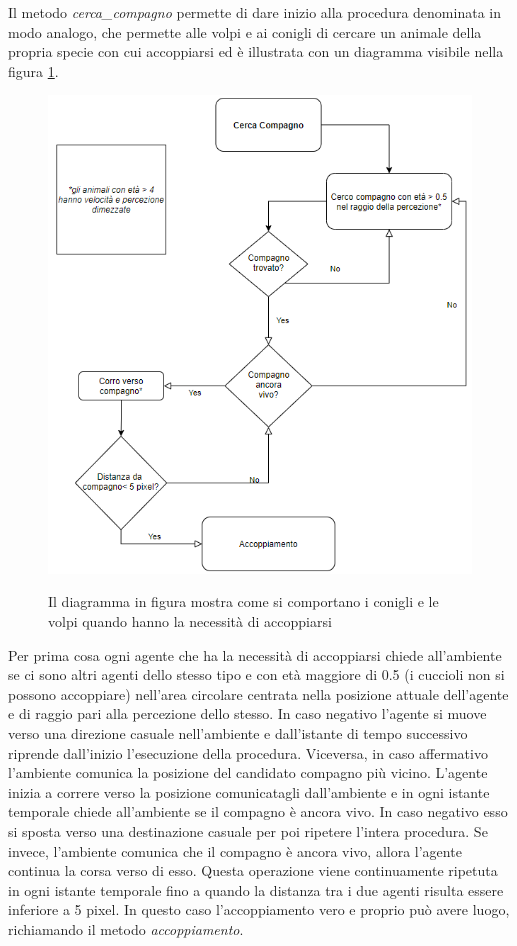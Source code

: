 \documentclass[11pt]{article}
\begin{document}
Il metodo \emph{cerca\_compagno} permette di dare inizio alla procedura denominata in modo analogo, che permette alle volpi e ai conigli di cercare un animale della propria specie con cui accoppiarsi ed è illustrata con un diagramma visibile nella figura \ref{fig:diagrammaAccoppiamento}.
\begin{figure}
     \centering
     \includegraphics[scale = 0.7]{Cerca_Compagno.PNG}
     \label{fig:diagrammaAccoppiamento}
     \caption{Il diagramma in figura mostra come si comportano i conigli e le volpi quando hanno la necessità di accoppiarsi}
\end{figure}
Per prima cosa ogni agente che ha la necessità di accoppiarsi chiede all'ambiente se ci sono altri agenti dello stesso tipo e con età maggiore di 0.5 (i cuccioli non si possono accoppiare) nell'area circolare centrata nella posizione attuale dell'agente e di raggio pari alla percezione dello stesso.
In caso negativo l'agente si muove verso una direzione casuale nell'ambiente e dall'istante di tempo successivo riprende dall'inizio l'esecuzione della procedura. Viceversa, in caso affermativo l'ambiente comunica la posizione del candidato compagno più vicino. L'agente inizia a correre verso la posizione comunicatagli dall'ambiente e in ogni istante temporale chiede all'ambiente se il compagno è ancora vivo. In caso negativo esso si sposta verso una destinazione casuale per poi ripetere l'intera procedura. Se invece, l'ambiente comunica che il compagno è ancora vivo, allora l'agente continua la corsa verso di esso. Questa operazione viene continuamente ripetuta in ogni istante temporale fino a quando la distanza tra i due agenti risulta essere inferiore a 5 pixel. In questo caso l'accoppiamento vero e proprio può avere luogo, richiamando il metodo \emph{accoppiamento}. 
\end{document}
